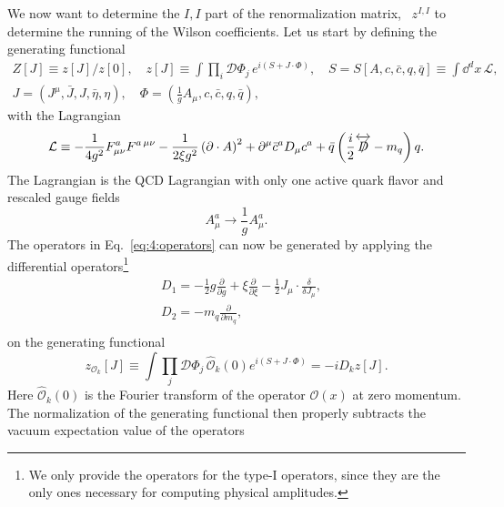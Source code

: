 We now want to determine the $I,I$ part of the renormalization matrix, \ie\ $z^{I,I}$ to determine the running of the Wilson coefficients. Let us start by defining the generating functional
\begin{equation}
\begin{gathered}
Z[J] \equiv z[J]/z[0], \quad z[J] \equiv \int \prod_i \mathcal{D} \Phi_j\, e^{i(S + J \cdot \Phi)}, \quad S = S[A, c, \bar{c}, q, \bar{q}] \equiv \int \dd^d x\, \mathcal{L}, \\
J = \left( J^\mu, \bar{J}, J, \bar{\eta}, \eta \right), \quad \Phi = \left(\frac{1}{g} A_\mu, c, \bar{c}, q, \bar{q}\right),
\end{gathered}
\end{equation}
with the Lagrangian
\begin{equation}
\mathcal{L} \equiv -\frac{1}{4g^2} F^a_{\mu\nu} F^{a \, \mu \nu} - \frac{1}{2 \xi g^2} \left(\partial \cdot A \right)^2 + \partial^\mu \bar{c}^a D_\mu c^a + \bar{q} \left(\frac{i}{2} \overleftrightarrow{\slashed{D}} - m_q \right) q.
\end{equation}
The Lagrangian is the QCD Lagrangian with only one active quark flavor and rescaled gauge fields
\begin{equation}
A^a_\mu \longrightarrow \frac{1}{g} A^a_\mu.
\end{equation}
The operators in Eq.~\eqref{eq:4:operators} can now be generated by applying the differential operators\footnote{We only provide the operators for the type-I operators, since they are the only ones necessary for computing physical amplitudes. }
\begin{equation}
\begin{split}
&D_1 = - \frac{1}{2}g \frac{\partial}{\partial g} + \xi \frac{\partial}{\partial \xi} - \frac{1}{2} J_\mu \cdot \frac{\delta}{\delta J_\mu}, \\
&D_2 = - m_q \frac{\partial}{\partial m_q}, \\
\end{split}
\label{eq:4:differential_operators}
\end{equation}
on the generating functional
\begin{equation}
z_{\mathcal{O}_k}[J] \equiv \int \prod_j \mathcal{D} \Phi_j \, \hat{\mathcal{O}}_k(0) e^{i(S + J \cdot \Phi)} = - i D_k z[J].
\end{equation}
Here $\hat{\mathcal{O}}_k(0)$ is the Fourier transform of the operator $\mathcal{O}(x)$ at zero momentum. The normalization of the generating functional then properly subtracts the vacuum expectation value of the operators
